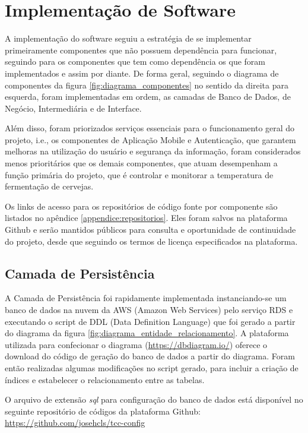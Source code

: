 \section{Implementação de Software}

A implementação do software seguiu a estratégia de se implementar primeiramente componentes que não possuem dependência para funcionar, seguindo para os componentes que tem como dependência os que foram implementados e assim por diante. De forma geral, seguindo o diagrama de componentes da figura \ref{fig:diagrama_componentes} no sentido da direita para esquerda, foram implementadas em ordem, as camadas de Banco de Dados, de Negócio, Intermediária e de Interface. 


Além disso, foram priorizados serviços essenciais para o funcionamento geral do projeto, i.e., os componentes de Aplicação Mobile e Autenticação, que garantem melhoras na utilização do usuário e segurança da informação, foram considerados menos prioritários que os demais componentes, que atuam desempenham a função primária do projeto, que é controlar e monitorar a temperatura de fermentação de cervejas.


Os links de acesso para os repositórios de código fonte por componente são listados no apêndice \ref{appendice:repositorios}. Eles foram salvos na plataforma Github e serão mantidos públicos para consulta e oportunidade de continuidade do projeto, desde que seguindo os termos de licença especificados na plataforma.


\subsection{Camada de Persistência}


A Camada de Persistência foi rapidamente implementada instanciando-se um banco de dados na nuvem da AWS (Amazon Web Services) pelo serviço RDS e executando o script de DDL (Data Definition Language) que foi gerado a partir do diagrama da figura \ref{fig:diagrama_entidade_relacionamento}. A plataforma utilizada para confecionar o diagrama (\url{https://dbdiagram.io/}) oferece o download do código de geração do banco de dados a partir do diagrama. Foram então realizadas algumas modificações no script gerado, para incluir a criação de índices e estabelecer o relacionamento entre as tabelas.  


O arquivo de extensão \textit{sql} para configuração do banco de dados está disponível no seguinte repositório de códigos da plataforma Github: \url{https://github.com/josehcls/tcc-config}


